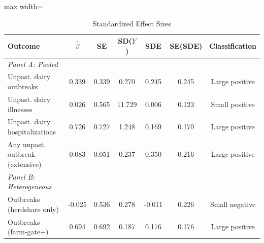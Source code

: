 \begin{table}[t]
\centering
\caption{Standardized Effect Sizes}
\label{tab:sde}
\begin{adjustbox}{max width=\textwidth}
\begin{tabular}{lcccccc}
\hline\hline
Outcome & $\hat{\beta}$ & SE & SD($Y$) & SDE & SE(SDE) & Classification \\
\hline
\textit{Panel A: Pooled} & & & & & & \\
Unpast. dairy outbreaks & 0.339 & 0.339 & 0.270 & 0.245 & 0.245 & Large positive \\
Unpast. dairy illnesses & 0.026 & 0.565 & 11.729 & 0.006 & 0.123 & Small positive \\
Unpast. dairy hospitalizations & 0.726 & 0.727 & 1.248 & 0.169 & 0.170 & Large positive \\
Any unpast. outbreak (extensive) & 0.083 & 0.051 & 0.237 & 0.350 & 0.216 & Large positive \\
\hline
\textit{Panel B: Heterogeneous} & & & & & & \\
Outbreaks (herdshare only) & -0.025 & 0.536 & 0.278 & -0.011 & 0.226 & Small negative \\
Outbreaks (farm-gate+) & 0.694 & 0.692 & 0.187 & 0.176 & 0.176 & Large positive \\
\hline\hline
\end{tabular}
\end{adjustbox}
\begin{tablenotes}[flushleft]
\small

\end{tablenotes}
\end{table}
